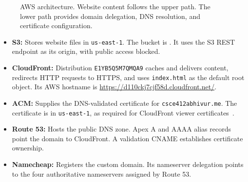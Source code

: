 \documentclass[11pt]{article}
\begin{document}
\begin{figure}[htbp]
\centering
{}
\caption{AWS architecture. Website content follows the upper path. The lower path provides domain delegation, DNS resolution, and certificate configuration.}
\label{fig:aws}
\end{figure}

\begin{itemize}
  \item \textbf{S3:} Stores website files in \texttt{us-east-1}. The bucket is . It uses the S3 REST endpoint as its origin, with public access blocked.
  \item \textbf{CloudFront:} Distribution \texttt{E1YB5Q5M7QMQA9} caches and delivers content, redirects HTTP requests to HTTPS, and uses \texttt{index.html} as the default root object. Its AWS hostname is \url{https://d110ckj7cjf58d.cloudfront.net/}.
  \item \textbf{ACM:} Supplies the DNS-validated certificate for \texttt{csce412abhivur.me}. The certificate is in \texttt{us-east-1}, as required for CloudFront viewer certificates~\cite{acm}.
  \item \textbf{Route 53:} Hosts the public DNS zone. Apex A and AAAA alias records point the domain to CloudFront. A validation CNAME establishes certificate ownership.
  \item \textbf{Namecheap:} Registers the custom domain. Its nameserver delegation points to the four authoritative nameservers assigned by Route 53.
\end{itemize}
\end{document}
